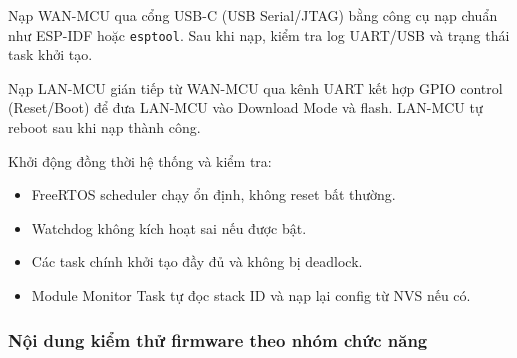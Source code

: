         Nạp WAN-MCU qua cổng USB-C (USB Serial/JTAG) bằng công cụ nạp chuẩn như ESP-IDF hoặc \texttt{esptool}. Sau khi nạp, kiểm tra log UART/USB và trạng thái task khởi tạo.
        
        Nạp LAN-MCU gián tiếp từ WAN-MCU qua kênh UART kết hợp GPIO control (Reset/Boot) để đưa LAN-MCU vào Download Mode và flash. LAN-MCU tự reboot sau khi nạp thành công.
        
        Khởi động đồng thời hệ thống và kiểm tra:
        \begin{itemize}
            \item FreeRTOS scheduler chạy ổn định, không reset bất thường.
            \item Watchdog không kích hoạt sai nếu được bật.
            \item Các task chính khởi tạo đầy đủ và không bị deadlock.
            \item Module Monitor Task tự đọc stack ID và nạp lại config từ NVS nếu có.
        \end{itemize}
        
        \subsubsection{Nội dung kiểm thử firmware theo nhóm chức năng}
        
